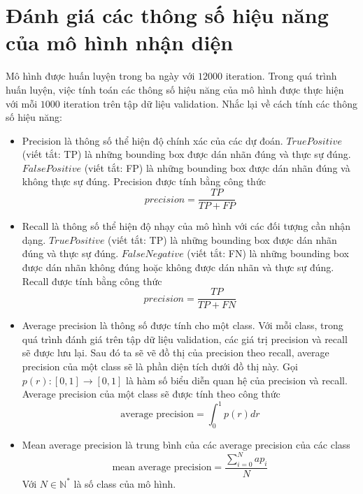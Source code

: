 \chapter{Đánh giá các thông số hiệu năng của mô hình nhận diện}
Mô hình được huấn luyện trong ba ngày với $12000$ iteration. Trong quá trình huấn luyện, việc tính toán các thông số hiệu năng của mô hình được thực hiện với mỗi $1000$ iteration trên tập dữ liệu validation. 
Nhắc lại về cách tính các thông số hiệu năng:
\begin{itemize}
	\item Precision là thông số thể hiện độ chính xác của các dự đoán. $True Positive$ (viết tắt: TP) là những bounding box được dán nhãn đúng và thực sự đúng. $False Positive$ (viết tắt: FP) là những bounding box được dán nhãn đúng và không thực sự đúng. Precision được tính bằng công thức
	\begin{equation}
		precision = \frac{TP}{TP+FP}
	\end{equation}
	\item Recall là thông số thể hiện độ nhạy của mô hình với các đối tượng cần nhận dạng. $True Positive$ (viết tắt: TP) là những bounding box được dán nhãn đúng và thực sự đúng. $False Negative$ (viết tắt: FN) là những bounding box được dán nhãn không đúng hoặc không được dán nhãn và thực sự đúng. Recall được tính bằng công thức
	\begin{equation}
		precision = \frac{TP}{TP+FN}
	\end{equation}
	\item Average precision là thông số được tính cho một class. Với mỗi class, trong quá trình đánh giá trên tập dữ liệu validation, các giá trị precision và recall sẽ được lưu lại. Sau đó ta sẽ vẽ đồ thị của precision theo recall, average precision của một class sẽ là phần diện tích dưới đồ thị này. Gọi $p(r):[0,1]\rightarrow[0,1]$ là hàm số biểu diễn quan hệ của precision và recall. Average precision của một class sẽ được tính theo công thức
	\begin{equation}
		\text{average precision} = \int_{0}^{1} p(r) dr
	\end{equation}
	\item Mean average precision là trung bình của các average precision của các class
	\begin{equation}
		\text{mean average precision} = \frac{\sum_{i=0}^{N} ap_i}{N}
	\end{equation}
	Với $N \in \mathbb{N}^*$ là số class của mô hình.
\end{itemize}

